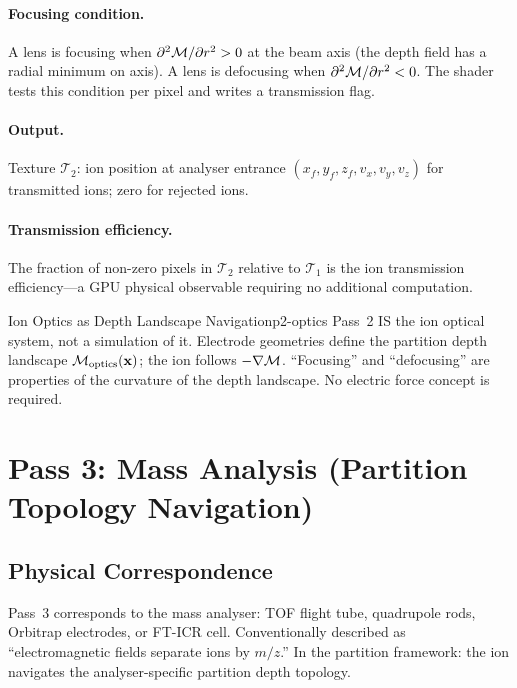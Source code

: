 \paragraph{Focusing condition.}
A lens is focusing when $\partial^2\mathcal{M}/\partial r^2 > 0$ at the beam axis
(the depth field has a radial minimum on axis).  A lens is defocusing when
$\partial^2\mathcal{M}/\partial r^2 < 0$.  The shader tests this condition per
pixel and writes a transmission flag.

\paragraph{Output.}
Texture $\mathcal{T}_2$: ion position at analyser entrance $(x_f, y_f, z_f,
v_x, v_y, v_z)$ for transmitted ions; zero for rejected ions.

\paragraph{Transmission efficiency.}
The fraction of non-zero pixels in $\mathcal{T}_2$ relative to $\mathcal{T}_1$
is the ion transmission efficiency---a GPU physical observable requiring no
additional computation.

\begin{consequence}{Ion Optics as Depth Landscape Navigation}{p2-optics}
  Pass~2 IS the ion optical system, not a simulation of it.  Electrode
  geometries define the partition depth landscape $\mathcal{M}_{\mathrm{optics}}
  (\mathbf{x})$; the ion follows $-\nabla\mathcal{M}$.  ``Focusing'' and
  ``defocusing'' are properties of the curvature of the depth landscape.
  No electric force concept is required.
\end{consequence}

\section{Pass 3: Mass Analysis (Partition Topology Navigation)}
\label{sec:ch22-pass3}

\subsection{Physical Correspondence}

Pass~3 corresponds to the mass analyser: TOF flight tube, quadrupole rods,
Orbitrap electrodes, or FT-ICR cell.  Conventionally described as
``electromagnetic fields separate ions by $m/z$.''  In the partition framework:
the ion navigates the analyser-specific partition depth topology.

